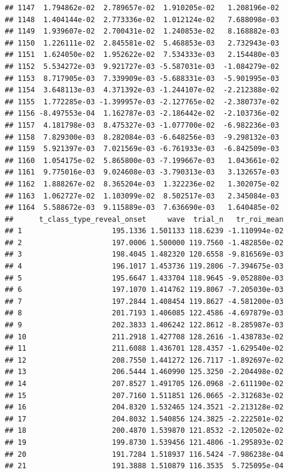 \documentclass[
]{article}
\begin{document}
\begin{verbatim}
## 1147  1.794862e-02  2.789657e-02  1.910205e-02   1.208196e-02
## 1148  1.404144e-02  2.773336e-02  1.012124e-02   7.688098e-03
## 1149  1.939607e-02  2.700431e-02  1.240853e-02   8.168882e-03
## 1150  1.226111e-02  2.845581e-02  5.468853e-03   2.732943e-03
## 1151  1.624050e-02  1.952622e-02  7.534333e-03   2.154480e-03
## 1152  5.534272e-03  9.921727e-03 -5.587031e-03  -1.084279e-02
## 1153  8.717905e-03  7.339909e-03 -5.688331e-03  -5.901995e-03
## 1154  3.648113e-03  4.371392e-03 -1.244107e-02  -2.212388e-02
## 1155  1.772285e-03 -1.399957e-03 -2.127765e-02  -2.380737e-02
## 1156 -8.497553e-04  1.162787e-03 -2.186442e-02  -2.103736e-02
## 1157  4.181798e-03  8.475327e-03 -1.077700e-02  -6.982236e-03
## 1158  7.829300e-03  8.282084e-03 -6.648256e-03  -9.298132e-03
## 1159  5.921397e-03  7.021569e-03 -6.761933e-03  -6.842509e-03
## 1160  1.054175e-02  5.865800e-03 -7.199667e-03   1.043661e-02
## 1161  9.775016e-03  9.024608e-03 -3.790313e-03   3.132657e-03
## 1162  1.888267e-02  8.365204e-03  1.322236e-02   1.302075e-02
## 1163  1.062727e-02  1.103099e-02  8.502517e-03   2.345084e-03
## 1164  5.588672e-03  9.115889e-03  7.636690e-03   1.640485e-02
##      t_class_type_reveal_onset     wave  trial_n   tr_roi_mean
## 1                     195.1336 1.501133 118.6239 -1.110994e-02
## 2                     197.0006 1.500000 119.7560 -1.482850e-02
## 3                     198.4045 1.482320 120.6558 -9.816569e-03
## 4                     196.1017 1.453736 119.2806 -7.394675e-03
## 5                     195.6647 1.433704 118.9645 -9.052880e-03
## 6                     197.1070 1.414762 119.8067 -7.205030e-03
## 7                     197.2844 1.408454 119.8627 -4.581200e-03
## 8                     201.7193 1.406085 122.4586 -4.697879e-03
## 9                     202.3833 1.406242 122.8612 -8.285987e-03
## 10                    211.2918 1.427708 128.2616 -1.438783e-02
## 11                    211.6088 1.436701 128.4357 -1.629540e-02
## 12                    208.7550 1.441272 126.7117 -1.892697e-02
## 13                    206.5444 1.460990 125.3250 -2.204498e-02
## 14                    207.8527 1.491705 126.0968 -2.611190e-02
## 15                    207.7160 1.511851 126.0665 -2.312683e-02
## 16                    204.8320 1.532465 124.3521 -2.213128e-02
## 17                    204.8032 1.540856 124.3825 -2.222501e-02
## 18                    200.4870 1.539870 121.8532 -2.120502e-02
## 19                    199.8730 1.539456 121.4806 -1.295893e-02
## 20                    191.7284 1.518937 116.5424 -7.986238e-04
## 21                    191.3888 1.510879 116.3535  5.725095e-04

\end{verbatim}
\end{document}

